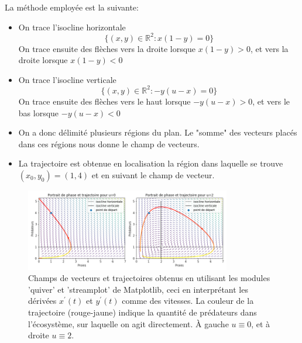 \documentclass[
	french,
	11pt, %
]{fphw}
\begin{document}
La méthode employée est la suivante:

\begin{itemize}
	\item On trace l'isocline horizontale
	$$
	\{(x,y) \in \mathbb{R}^2 : x(1-y) = 0 \}
	$$
	On trace ensuite des flèches vers la droite lorsque $x(1-y) > 0$, et vers la droite lorsque $x(1-y) < 0$ 
	\item On trace l'isocline verticale
	$$
	\{(x,y) \in \mathbb{R}^2 : -y(u-x) = 0\}
	$$
	On trace ensuite des flèches vers le haut lorsque $-y(u-x)>0$, et vers le bas lorsque $-y(u-x) < 0$ 
	\item On a donc délimité plusieurs régions du plan. Le "somme" des vecteurs placés dans ces régions nous donne le champ de vecteurs.
	\item La trajectoire est obtenue en localisation la région dans laquelle se trouve $(x_0,y_0)=(1,4)$ et en suivant le champ de vecteur.
\end{itemize}




\begin{figure}[H]
    \centering
	\includegraphics[width=0.8\textwidth]{PhasePy.png}
	\caption{Champs de vecteurs et trajectoires obtenus en utilisant les modules 'quiver' et 'streamplot' de Matplotlib, ceci en interprétant les dérivées $x^\prime(t)$ et $y^\prime(t)$ comme des vitesses. La couleur de la trajectoire (rouge-jaune) indique la quantité de prédateurs dans l'écosystème, sur laquelle on agit directement. À gauche $u\equiv0$, et à droite $u\equiv2$.}
	\label{fig:phase}
\end{figure}
\end{document}

